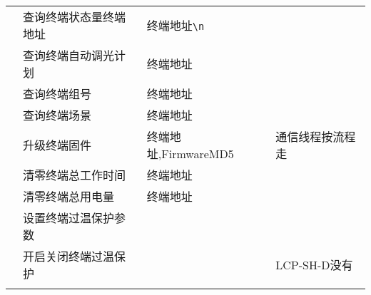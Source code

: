 \begin{longtabu}[c]{@{}rXXX@{}}
\\ & 查询终端状态量终端地址 & 终端地址\texttt{\textbackslash{}n} &
\\ & 查询终端自动调光计划 & 终端地址 &
\\ & 查询终端组号 & 终端地址 &
\\ & 查询终端场景 & 终端地址 &
\\ & 升级终端固件 & 终端地址,FirmwareMD5 & 通信线程按流程走
\\ & 清零终端总工作时间 & 终端地址 &
\\ & 清零终端总用电量 & 终端地址 &
\\ & 设置终端过温保护参数 & &
\\ & 开启关闭终端过温保护 & & LCP-SH-D没有
\\\addlinespace
\bottomrule
\end{longtabu}
